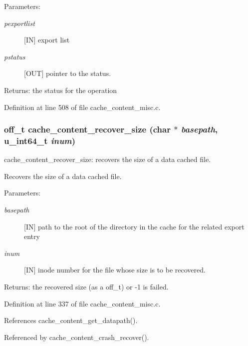 \begin{Desc}
\item[Parameters:]
\begin{description}
\item[{\em pexportlist}][IN] export list \item[{\em pstatus}][OUT] pointer to the status.\end{description}
\end{Desc}
\begin{Desc}
\item[Returns:]the status for the operation \end{Desc}


Definition at line 508 of file cache\_\-content\_\-misc.c.
\subsubsection{\setlength{\rightskip}{0pt plus 5cm}off\_\-t cache\_\-content\_\-recover\_\-size (char $\ast$ {\em basepath}, u\_\-int64\_\-t {\em inum})}\label{cache__content__misc_8c_a8}


cache\_\-content\_\-recover\_\-size: recovers the size of a data cached file.

Recovers the size of a data cached file.

\begin{Desc}
\item[Parameters:]
\begin{description}
\item[{\em basepath}][IN] path to the root of the directory in the cache for the related export entry \item[{\em inum}][IN] inode number for the file whose size is to be recovered.\end{description}
\end{Desc}
\begin{Desc}
\item[Returns:]the recovered size (as a off\_\-t) or -1 is failed. \end{Desc}


Definition at line 337 of file cache\_\-content\_\-misc.c.

References cache\_\-content\_\-get\_\-datapath().

Referenced by cache\_\-content\_\-crash\_\-recover().
